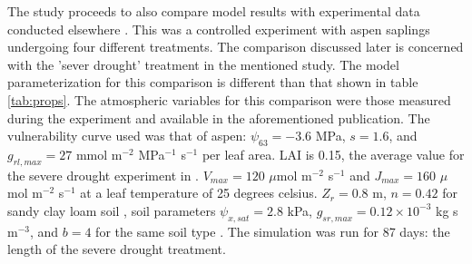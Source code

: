 \documentclass[utf8]{frontiersSCNS} %
\begin{document}
The study proceeds to also compare model results with experimental data conducted elsewhere \citep{venturas_2018}. This was a controlled experiment with aspen saplings undergoing four different treatments. The comparison discussed later is concerned with the 'sever drought' treatment in the mentioned study. The model parameterization for this comparison is different than that shown in table \ref{tab:props}. The atmospheric variables for this comparison were those measured during the experiment and available in the aforementioned publication. The vulnerability curve used was that of aspen: $\psi_{63} = -3.6$ MPa, $s=1.6$, and $g_{rl,max} = 27$ mmol m$^{-2}$ MPa$^{-1}$ s$^{-1}$ per leaf area. LAI is 0.15, the average value for the severe drought experiment in \citep{venturas_2018}. $V_{max} = 120$ $\mu$mol m$^{-2}$ s$^{-1}$ and $J_{max} = 160$ $\mu$mol m$^{-2}$ s$^{-1}$ at a leaf temperature of 25 degrees celsius. $Z_r = 0.8$ m, $n = 0.42$ for sandy clay loam soil \cite{clapp_empirical_1978}, soil parameters $\psi_{x,sat} = 2.8$ kPa, $g_{sr,max} = 0.12 \times 10^{-3}$ kg s m$^{-3}$, and $b = 4$ for the same soil type \citep{campbell_introduction_2012}. The simulation was run for 87 days: the length of the severe drought treatment.
\end{document}
